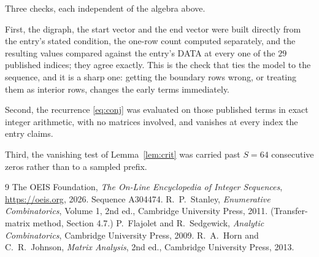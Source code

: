 \documentclass[11pt,a4paper]{article}
\theoremstyle{plain}
\theoremstyle{definition}
\begin{document}
Three checks, each independent of the algebra above.

First, the digraph, the start vector and the end vector were built directly from the
entry's stated condition, the one-row count computed separately, and the resulting values
compared against the entry's DATA at every one of the $29$ published indices; they
agree exactly. This is the check that ties the model to the sequence, and it is a sharp one:
getting the boundary rows wrong, or treating them as interior rows, changes the early terms
immediately.

Second, the recurrence \eqref{eq:conj} was evaluated on those published terms in exact
integer arithmetic, with no matrices involved, and vanishes at every index the entry claims.

Third, the vanishing test of Lemma~\ref{lem:crit} was carried past $S=64$ consecutive
zeros rather than to a sampled prefix.

\begin{thebibliography}{9}
 The OEIS Foundation, \emph{The On-Line Encyclopedia of Integer
Sequences}, \url{https://oeis.org}, 2026. Sequence A304474.
 R.~P.~Stanley, \emph{Enumerative Combinatorics}, Volume 1, 2nd ed.,
Cambridge University Press, 2011. (Transfer-matrix method, Section 4.7.)
 P.~Flajolet and R.~Sedgewick, \emph{Analytic Combinatorics}, Cambridge
University Press, 2009.
 R.~A.~Horn and C.~R.~Johnson, \emph{Matrix Analysis}, 2nd ed., Cambridge
University Press, 2013.
\end{thebibliography}
\end{document}

